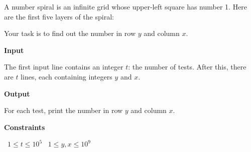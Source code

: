 A number spiral is an infinite grid whose upper-left square has number 1. Here are the first five layers of the spiral:

Your task is to find out the number in row $y$ and column $x$.

\vspace{0.3cm}\noindent\textbf{Input}

The first input line contains an integer $t$: the number of tests.
After this, there are $t$ lines, each containing integers $y$ and $x$.

\vspace{0.3cm}\noindent\textbf{Output}

For each test, print the number in row $y$ and column $x$.

\vspace{0.3cm}\noindent\textbf{Constraints}

\textbullet\ $1 \le t \le 10^5$
\textbullet\ $1 \le y,x \le 10^9$